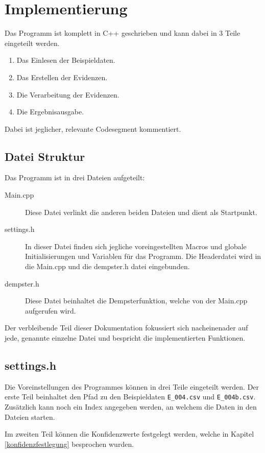\chapter{Implementierung}
\label{implementation}
Das Programm ist komplett in C++ geschrieben und kann dabei in 3 Teile eingeteilt werden.

\begin{enumerate}
  \item Das Einlesen der Beispieldaten. 
  \item Das Erstellen der Evidenzen.
  \item Die Verarbeitung der Evidenzen.
  \item Die Ergebnisausgabe.
\end{enumerate}

Dabei ist jeglicher, relevante Codesegment kommentiert.

\section{Datei Struktur}
Das Programm ist in drei Dateien aufgeteilt:

\begin{description}
  \item [Main.cpp] Diese Datei verlinkt die anderen beiden Dateien und dient als Startpunkt. 
  \item [settings.h] In dieser Datei finden sich jegliche voreingestellten Macros und globale Initialisierungen und Variablen für das Programm. Die Headerdatei wird in die Main.cpp und die dempster.h datei eingebunden.
  \item [dempster.h] Diese Datei beinhaltet die Dempsterfunktion, welche von der Main.cpp aufgerufen wird.
  \end{description}

 Der verbleibende Teil dieser Dokumentation fokussiert sich nacheinenader auf jede, genannte einzelne Datei und bespricht die implementierten Funktionen.

\section{settings.h}
Die Voreinstellungen des Programmes können in drei Teile eingeteilt werden.
Der erste Teil beinhaltet den Pfad zu den Beispieldaten \verb|E_004.csv| und \verb|E_004b.csv|. Zusätzlich kann noch ein Index angegeben werden, an welchem die Daten in den Dateien starten.

Im zweiten Teil können die Konfidenzwerte festgelegt werden, welche in Kapitel \ref{konfidenzfestlegung} besprochen wurden.

